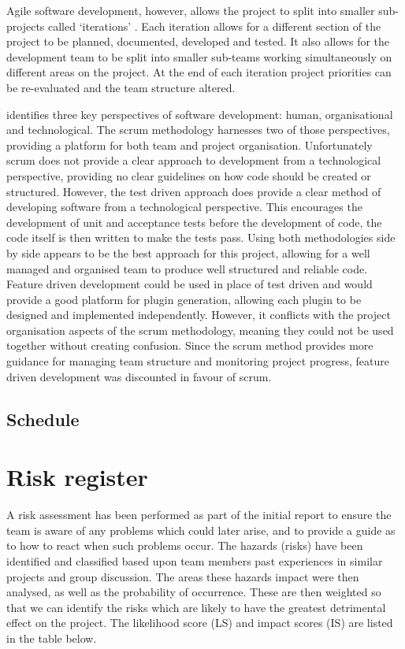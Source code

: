 \documentclass[10pt,a4paper]{article}
\begin{document}
Agile software development, however, allows the project to split into smaller
sub-projects called `iterations' \cite{hazzan2008agile}. Each iteration allows
for a different section of the project to be planned, documented, developed and
tested. It also allows for the development team to be split into smaller
sub-teams working simultaneously on different areas on the project. At the end
of each iteration project priorities can be re-evaluated and the team structure
altered. 

\cite{hazzan2008agile} identifies three key perspectives of software
development: human, organisational and technological. The scrum methodology
harnesses two of those perspectives, providing a platform for both team and
project organisation. Unfortunately scrum does not provide a clear approach to
development from a technological perspective, providing no clear guidelines on
how code should be created or structured. However, the test driven approach does
provide a clear method of developing software from a technological perspective.
This encourages the development of unit and acceptance tests before the
development of code, the code itself is then written to make the tests pass.
Using both methodologies side by side appears to be the best approach for this
project, allowing for a well managed and organised team to produce well
structured and reliable code. Feature driven development could be used in place
of test driven and would provide a good platform for plugin generation, allowing
each plugin to be designed and implemented independently. However, it conflicts
with the project organisation aspects of the scrum methodology, meaning they
could not be used together without creating confusion. Since the scrum method
provides more guidance for managing team structure and monitoring project
progress, feature driven development was discounted in favour of scrum.

\subsection{Schedule}


\section{Risk register}

A risk assessment has been performed as part of the initial report to ensure the
team is aware of any problems which could later arise, and to provide a guide as
to how to react when such problems occur. The hazards (risks) have been
identified and classified based upon team members past experiences in similar
projects and group discussion. The areas these hazards impact were then
analysed, as well as the probability of occurrence. These are then weighted so
that we can identify the risks which are likely to have the greatest detrimental
effect on the project. The likelihood score (LS) and impact scores (IS) are
listed in the table below.
\end{document}
